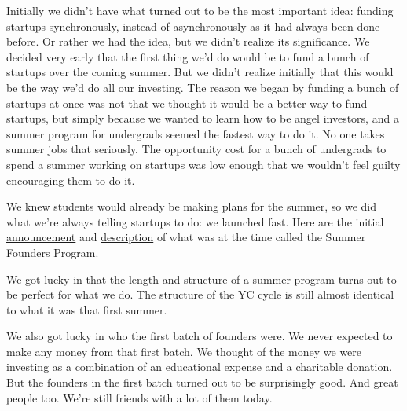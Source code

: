                   
                    Initially we didn't have what turned out to be the most
                    important idea: funding startups synchronously, instead of
                    asynchronously as it had always been done before. Or rather
                    we had the idea, but we didn't realize its significance. We
                    decided very early that the first thing we'd do would be to
                    fund a bunch of startups over the coming summer. But we
                    didn't realize initially that this would be the way we'd do
                    all our investing. The reason we began by funding a bunch of
                    startups at once was not that we thought it would be a
                    better way to fund startups, but simply because we wanted to
                    learn how to be angel investors, and a summer program for
                    undergrads seemed the fastest way to do it. No one takes
                    summer jobs that seriously. The opportunity cost for a bunch
                    of undergrads to spend a summer working on startups was low
                    enough that we wouldn't feel guilty encouraging them to do
                    it.
                  


                  
                    We knew students would already be making plans for the
                    summer, so we did what we're always telling startups to do:
                    we launched fast. Here are the initial
                    \href{http://www.paulgraham.com/summerfounder.html}{announcement}
                    and
                    \href{https://web.archive.org/web/20170609055553/http://ycombinator.com/old/sfp.html}{description}
                    of what was at the time called the Summer Founders Program.
                  


                  
                    We got lucky in that the length and structure of a summer
                    program turns out to be perfect for what we do. The
                    structure of the YC cycle is still almost identical to what
                    it was that first summer.
                  


                  
                    We also got lucky in who the first batch of founders were.
                    We never expected to make any money from that first batch.
                    We thought of the money we were investing as a combination
                    of an educational expense and a charitable donation. But the
                    founders in the first batch turned out to be surprisingly
                    good. And great people too. We're still friends with a lot
                    of them today.
                  


